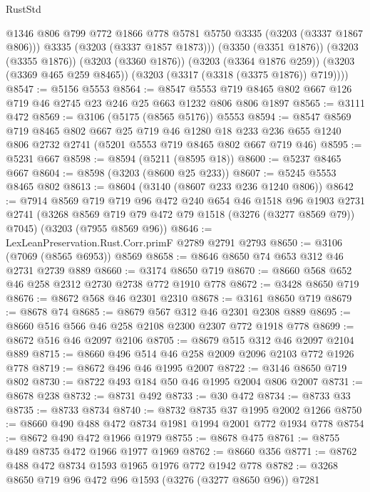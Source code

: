 \begin{lexlean}{RustStd}
\begin{coremodule}
{\begin{coremodule}
{{{{{{{{{{{{{{{            @1346
            @806
            @799
            @772
            @1866
            @778
            @5781
            @5750
            @3335
            (@3203 (@3337 @1867 @806)))
          @3335
          (@3203 (@3337 @1857 @1873)))
        (@3350 (@3351 @1876))
        (@3203 (@3355 @1876))
        (@3203 (@3360 @1876))
        (@3203 (@3364 @1876 @259))
        (@3203 (@3369 @465 @259 @8465))
        (@3203 (@3317 (@3318 (@3375 @1876)) @719))))
@8547 := @5156 @5553
@8564 := @8547
    @5553
    @719
    @8465
    @802
    @667
    @126
    @719
    @46
    @2745
    @23
    @246
    @25
    @663
    @1232
    @806
    @806
    @1897
@8565 := @3111 @472
@8569 := @3106 (@5175 (@8565 @5176)) @5553
@8594 := @8547
    @8569
    @719
    @8465
    @802
    @667
    @25
    @719
    @46
    @1280
    @18
    @233
    @236
    @655
    @1240
    @806
    @2732
    @2741
    (@5201 @5553 @719 @8465 @802 @667 @719 @46)
@8595 := @5231 @667
@8598 := @8594 (@5211 (@8595 @18))
@8600 := @5237 @8465 @667
@8604 := @8598 (@3203 (@8600 @25 @233))
@8607 := @5245 @5553 @8465 @802
@8613 := @8604 (@3140 (@8607 @233 @236 @1240 @806))
@8642 := @7914
    @8569
    @719
    @719
    @96
    @472
    @240
    @654
    @46
    @1518
    @96
    @1903
    @2731
    @2741
    (@3268 @8569 @719 @79 @472 @79 @1518 (@3276 (@3277 @8569 @79)) @7045)
    (@3203 (@7955 @8569 @96))
@8646 := LexLeanPreservation.Rust.Corr.primF @2789 @2791 @2793
@8650 := @3106 (@7069 (@8565 @6953)) @8569
@8658 := @8646 @8650 @74 @653 @312 @46 @2731 @2739 @889
@8660 := @3174 @8650 @719
@8670 := @8660 @568 @652 @46 @258 @2312 @2730 @2738 @772 @1910 @778
@8672 := @3428 @8650 @719
@8676 := @8672 @568 @46 @2301 @2310
@8678 := @3161 @8650 @719
@8679 := @8678 @74
@8685 := @8679 @567 @312 @46 @2301 @2308 @889
@8695 := @8660 @516 @566 @46 @258 @2108 @2300 @2307 @772 @1918 @778
@8699 := @8672 @516 @46 @2097 @2106
@8705 := @8679 @515 @312 @46 @2097 @2104 @889
@8715 := @8660 @496 @514 @46 @258 @2009 @2096 @2103 @772 @1926 @778
@8719 := @8672 @496 @46 @1995 @2007
@8722 := @3146 @8650 @719 @802
@8730 := @8722 @493 @184 @50 @46 @1995 @2004 @806 @2007
@8731 := @8678 @238
@8732 := @8731 @492
@8733 := @30 @472
@8734 := @8733 @33
@8735 := @8733 @8734
@8740 := @8732 @8735 @37 @1995 @2002 @1266
@8750 := @8660 @490 @488 @472 @8734 @1981 @1994 @2001 @772 @1934 @778
@8754 := @8672 @490 @472 @1966 @1979
@8755 := @8678 @475
@8761 := @8755 @489 @8735 @472 @1966 @1977 @1969
@8762 := @8660 @356
@8771 := @8762 @488 @472 @8734 @1593 @1965 @1976 @772 @1942 @778
@8782 := @3268 @8650 @719 @96 @472 @96 @1593 (@3276 (@3277 @8650 @96)) @7281
}}}}}}}}}}}}}}}
\end{coremodule}}
\end{coremodule}
\end{lexlean}
